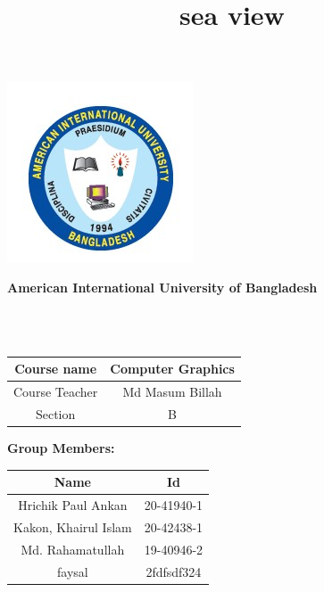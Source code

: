 \documentclass{article}
\title{sea view}
\begin{document}
\begin{center}
    \includegraphics{aiublogo.jpg}
\end{center}
\begin{code}
\textbf{American International University of Bangladesh}

\end{code}
\begin{code}
\color{red}{Computer Graphics - Project Documentation }
\end{code} \\
\\
\begin{center}
\begin{tabular}{c|c}
    \hline
    Course name  & Computer Graphics \\
    \hline
    Course Teacher & Md Masum Billah \\
    \hline
    Section & B
\end{tabular}
\end{center}


\begin{center}
  \begin{code}
\textbf{Group Members:}

\end{code}  
\end{center}
\begin{center}
\begin{tabular}{c|c}
    \hline
   Name  & Id \\
    \hline
    Hrichik Paul Ankan & 20-41940-1 \\
    \hline
    Kakon, Khairul Islam & 20-42438-1 \\
    \hline
    Md. Rahamatullah & 19-40946-2 \\
    \hline
    faysal & 2fdfsdf324 \\
    \hline
\end{tabular}
\end{center}\
\\
\end{document}
